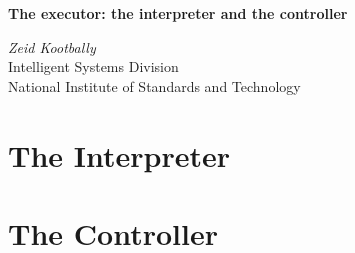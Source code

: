 \documentclass[12pt]{article}
\begin{document}
\begin{titlepage}
\begin{center}

\textbf{The executor: the interpreter and the controller}\\

\vspace{1.5cm} %

\textit{Zeid Kootbally}\\
Intelligent Systems Division\\
National Institute of Standards and Technology
                                                                                                                                                             \\

\end{center}
\end{titlepage}
\cleardoublepage

\tableofcontents
\cleardoublepage
{}
\listoffigures
\cleardoublepage
\section{The Interpreter}
\label{s:interpreter}


 \section{The Controller}
 \label{s:controller}
 
\end{document}

